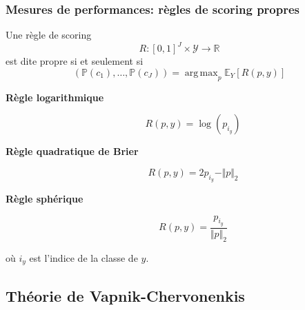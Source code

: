 \documentclass[dvipsnames,10pt]{beamer}
\DeclareMathOperator*{\argmax}{arg\,max}
\theoremstyle{plain}
\theoremstyle{definition}
\begin{document}
\begin{frame}
\frametitle{Mesures de performances: règles de scoring propres}
\begin{definition}
    Une règle de scoring
    \begin{equation*}
        R : [0,1]^J \times \mathcal{Y} \rightarrow \mathbb{R}
    \end{equation*}
    est dite propre si et seulement si
    \begin{equation*}
        \left( \mathbb{P}(c_1),\dotsc,\mathbb{P}(c_J)\right) = \argmax_p \mathbb{E}_Y \left[ R(p,y) \right]
    \end{equation*}
\end{definition}
\begin{description}
    \item[\textbf{Règle logarithmique}] \begin{equation*}
        R(p,y) = \log ( p_{i_y} )
    \end{equation*}
    \item[\textbf{Règle quadratique de Brier}] \begin{equation*}
        R(p,y) = 2 p_{i_y} - \Vert p \Vert_2
    \end{equation*}
    \item[\textbf{Règle sphérique}] \begin{equation*}
        R(p,y) = \frac{p_{i_y}}{\Vert p \Vert_2}
    \end{equation*}
\end{description}
où $i_y$ est l'indice de la classe de $y$.
\end{frame}

\subsection{Théorie de Vapnik-Chervonenkis}
\end{document}
